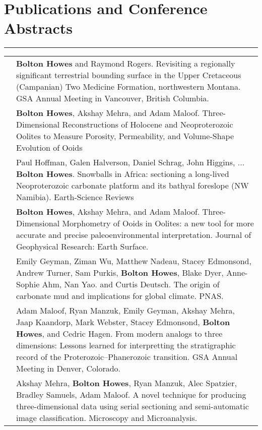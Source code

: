 \documentclass[letterpaper, 10pt]{article}
\newcommand{\headings}[1]{\section*{#1} \hrule \vspace{10pt}}
\begin{document}
\headings{Publications and Conference Abstracts}
\begin{center}
	\begin{tabularx}{\textwidth}{>{\itshape\arraybackslash}l X}
        2014 & \textbf{Bolton Howes} and Raymond Rogers. Revisiting a regionally significant terrestrial bounding surface in the Upper Cretaceous (Campanian) Two Medicine Formation, northwestern Montana. GSA Annual Meeting in Vancouver, British Columbia.\\
        
        2018 & \textbf{Bolton Howes}, Akshay Mehra, and Adam Maloof.  Three-Dimensional Reconstructions of Holocene and Neoproterozoic Oolites to Measure Porosity, Permeability, and Volume-Shape Evolution of Ooids\\
        
        2021 & Paul Hoffman, Galen Halverson, Daniel Schrag, John Higgins, ... \textbf{Bolton Howes}. Snowballs in Africa: sectioning a long-lived Neoproterozoic carbonate platform and its bathyal foreslope (NW Namibia). Earth-Science Reviews\\
        
        2021 & \textbf{Bolton Howes}, Akshay Mehra, and Adam Maloof. Three-Dimensional Morphometry of Ooids in Oolites: a new tool for more accurate and precise paleoenvironmental interpretation. Journal of Geophysical Research: Earth Surface.\\ 
        
        2022 & Emily Geyman, Ziman Wu, Matthew Nadeau, Stacey Edmonsond, Andrew Turner, Sam Purkis, \textbf{Bolton Howes}, Blake Dyer, Anne-Sophie Ahm, Nan Yao. and Curtis Deutsch. The origin of carbonate mud and implications for global climate. PNAS.\\
        
        2022 & Adam Maloof, Ryan Manzuk, Emily Geyman, Akshay Mehra, Jaap Kaandorp, Mark Webster, Stacey Edmonsond, \textbf{Bolton Howes}, and Cedric Hagen. From modern analogs to three dimensions: Lessons learned for interpretting the stratigraphic record of the Proterozoic--Phanerozoic transition. GSA Annual Meeting in Denver, Colorado.\\
        
        2022 & Akshay Mehra, \textbf{Bolton Howes}, Ryan Manzuk, Alec Spatzier, Bradley Samuels, Adam Maloof. A novel technique for producing three-dimensional data using serial sectioning and semi-automatic image classification. Microscopy and Microanalysis.
	\end{tabularx}
\end{center}
\end{document}
